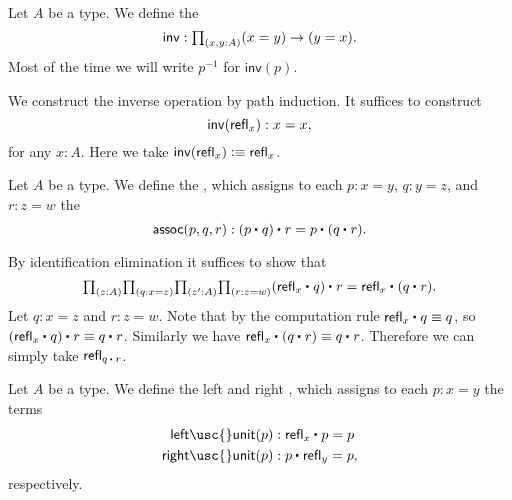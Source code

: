 \begin{defn}\label{defn:id_inv}
Let $A$ be a type. We define the 
\begin{equation*}
\mathsf{inv}:\prd{x,y:A} (x=y)\to (y=x).
\end{equation*}
Most of the time we will write $p^{-1}$ for $\mathsf{inv}(p)$.
\end{defn}

\begin{constr}
We construct the inverse operation by path induction. It suffices to construct
\begin{equation*}
\mathsf{inv}(\mathsf{refl}_{x}): x=x,
\end{equation*}
for any $x:A$. Here we take $\mathsf{inv}(\mathsf{refl}_{x})\vcentcolon\equiv \mathsf{refl}_{x}$.
\end{constr}

\begin{defn}\label{defn:id_assoc}
Let $A$ be a type. We define the , which assigns to each $p:x=y$, $q:y=z$, and $r:z=w$ the 
\begin{equation*}
\mathsf{assoc}(p,q,r) : \ct{(\ct{p}{q})}{r}=\ct{p}{(\ct{q}{r})}.
\end{equation*}
\end{defn}

\begin{constr}
By identification elimination it suffices to show that
\begin{equation*}
\prd{z:A}{q:x=z}{z':A}{r:z=w} \ct{(\ct{\refl{x}}{q})}{r}= \ct{\refl{x}}{(\ct{q}{r})}.
\end{equation*}
Let $q:x=z$ and $r:z=w$. Note that by the computation rule $\ct{\refl{x}}{q}\jdeq q$, so $\ct{(\ct{\refl{x}}{q})}{r}\jdeq \ct{q}{r}$. Similarly we have $\ct{\refl{x}}{(\ct{q}{r})}\jdeq \ct{q}{r}$. Therefore we can simply take $\refl{\ct{q}{r}}$.
\end{constr}

\begin{defn}\label{defn:id_unit}
Let $A$ be a type. We define the left and right , which assigns to each $p:x=y$ the terms
\begin{align*}
\mathsf{left\usc{}unit}(p) & : \ct{\refl{x}}{p}=p \\
\mathsf{right\usc{}unit}(p) & : \ct{p}{\refl{y}}=p,
\end{align*}
respectively.
\end{defn}

